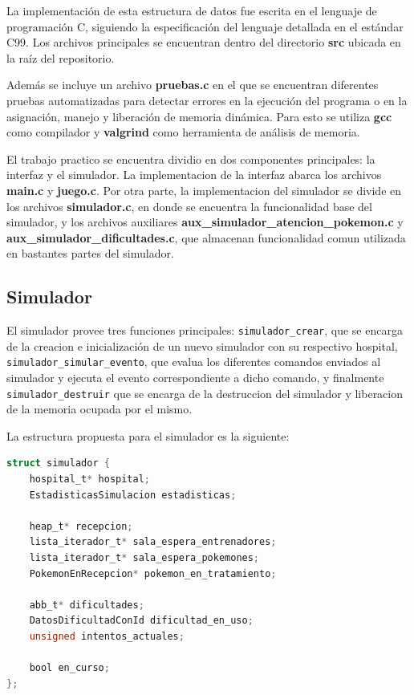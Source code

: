 \documentclass[titlepage,a4paper]{article}
\begin{document}
La implementación de esta estructura de datos fue escrita en el lenguaje de
programación C, siguiendo la especificación del lenguaje detallada en el
estándar C99. Los archivos principales se encuentran dentro del directorio
\textbf{src} ubicada en la raíz del repositorio. 

Además se incluye un archivo \textbf{pruebas.c} en el que se encuentran
diferentes pruebas automatizadas para detectar errores en la ejecución del
programa o en la asignación, manejo y liberación de memoria dinámica. Para esto
se utiliza \textbf{gcc} como compilador y \textbf{valgrind} como herramienta de
análisis de memoria.

El trabajo practico se encuentra dividio en dos componentes principales: la
interfaz y el simulador. La implementacion de la interfaz abarca los archivos
\textbf{main.c} y \textbf{juego.c}. Por otra parte, la implementacion del
simulador se divide en los archivos \textbf{simulador.c}, en donde se encuentra
la funcionalidad base del simulador, y los archivos auxiliares
\textbf{aux\_simulador\_atencion\_pokemon.c} y
\textbf{aux\_simulador\_dificultades.c}, que almacenan funcionalidad comun
utilizada en bastantes partes del simulador.

\subsection{Simulador}

El simulador provee tres funciones principales: \lstinline{simulador_crear},
que se encarga de la creacion e inicialización de un nuevo simulador con su
respectivo hospital, \lstinline{simulador_simular_evento}, que evalua los
diferentes comandos enviados al simulador y ejecuta el evento correspondiente
a dicho comando, y finalmente \lstinline{simulador_destruir} que se encarga de
la destruccion del simulador y liberacion de la memoria ocupada por el mismo.

La estructura propuesta para el simulador es la siguiente:

\begin{lstlisting}[language=C]
struct simulador {
	hospital_t* hospital;
	EstadisticasSimulacion estadisticas;

	heap_t* recepcion;
	lista_iterador_t* sala_espera_entrenadores;
	lista_iterador_t* sala_espera_pokemones;
	PokemonEnRecepcion* pokemon_en_tratamiento;

	abb_t* dificultades;
	DatosDificultadConId dificultad_en_uso;
	unsigned intentos_actuales;

	bool en_curso;
};
\end{lstlisting}
\end{document}
